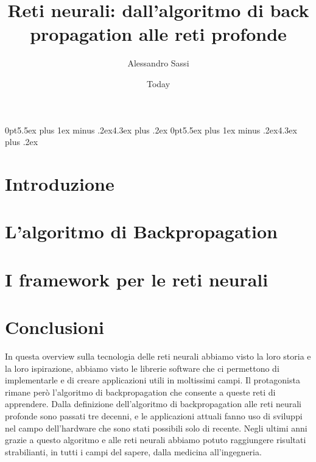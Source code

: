 \documentclass [12pt ,a4paper,openany]{book}
\begin{document}
\title{Reti neurali: dall'algoritmo di back propagation alle reti profonde }
\author{Alessandro Sassi}
\date{Today}

\titlespacing*{\section}
{0pt}{5.5ex plus 1ex minus .2ex}{4.3ex plus .2ex}
\titlespacing*{\subsection}
{0pt}{5.5ex plus 1ex minus .2ex}{4.3ex plus .2ex}






\tableofcontents
\chapter{Introduzione}

\chapter{L'algoritmo di Backpropagation }

\chapter{I framework per le reti neurali}


\chapter{Conclusioni}
In questa overview sulla tecnologia delle reti neurali abbiamo visto la loro storia e la loro ispirazione, abbiamo visto le librerie software che ci permettono di implementarle e di creare applicazioni utili in moltissimi campi. Il protagonista rimane però l'algoritmo di backpropagation che consente a queste reti di apprendere. Dalla definizione dell'algoritmo di backpropagation alle reti neurali profonde sono passati tre decenni, e le applicazioni attuali fanno uso di sviluppi nel campo dell'hardware che sono stati possibili solo di recente. Negli ultimi anni grazie a questo algoritmo e alle reti neurali abbiamo potuto raggiungere risultati strabilianti, in tutti i campi del sapere, dalla medicina all'ingegneria.
\end{document}
